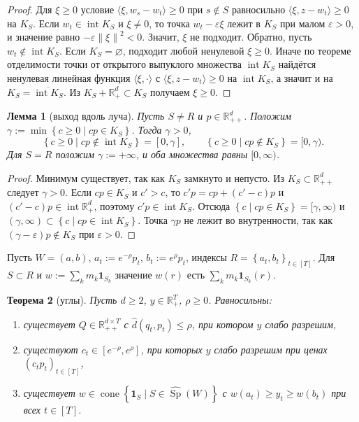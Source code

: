 \documentclass[a4paper,11pt]{article}
\theoremstyle{plain}
\newtheorem{theorem}{Теорема}[section]
\newtheorem{lemma}[theorem]{Лемма}
\theoremstyle{definition}
\theoremstyle{remark}
\newcommand{\R}{\mathbb{R}}
\newcommand{\norm}[1]{\left\lVert #1 \right\rVert}
\newcommand{\set}[1]{\left\{ #1 \right\}}
\newcommand{\ip}[2]{\langle #1, #2\rangle} %
\newcommand{\Rpp}[1][2]{\R^{#1}_{++}} %
\newcommand{\Rp}[1][2]{\R^{#1}_{+}}   %
\DeclareMathOperator{\cone}{cone}
\DeclareMathOperator{\Sp}{Sp}
\DeclareMathOperator{\interior}{int}
\newcommand{\dd}{\widehat d}
\begin{document}
\begin{proof}
    Для $\xi\ge0$ условие $\ip{\xi}{w_s-w_t}\ge0$ при $s\notin S$ равносильно $\ip{\xi}{z-w_t}\ge0$ на $K_S$. Если $w_t\in\interior K_S$ и $\xi\ne0$, то точка $w_t-\varepsilon\xi$ лежит в $K_S$ при малом $\varepsilon>0$, и значение равно $-\varepsilon\norm{\xi}^2<0$. Значит, $\xi$ не подходит. Обратно, пусть $w_t\notin\interior K_S$. Если $K_S=\varnothing$, подходит любой ненулевой $\xi\ge0$. Иначе по теореме отделимости точки от открытого выпуклого множества $\interior K_S$ найдётся ненулевая линейная функция $\ip{\xi}{\cdot}$ с $\ip{\xi}{z-w_t}\ge0$ на $\interior K_S$, а значит и на $K_S=\overline{\interior K_S}$. Из $K_S+\Rp[d]\subset K_S$ получаем $\xi\ge0$.
\end{proof}

\begin{lemma}[выход вдоль луча]\label{lem:ray}
    Пусть $S\ne R$ и $p\in\Rpp[d]$. Положим $\gamma:=\min\set{c\ge0\mid cp\in K_S}$. Тогда $\gamma>0$,
    \[
        \set{c\ge0\mid cp\notin\interior K_S}=[0,\gamma],\qquad\set{c\ge0\mid cp\notin K_S}=[0,\gamma).
    \]
    Для $S=R$ положим $\gamma:=+\infty$, и оба множества равны $[0,\infty)$.
\end{lemma}

\begin{proof}
    Минимум существует, так как $K_S$ замкнуто и непусто. Из $K_S\subset\Rpp[d]$ следует $\gamma>0$. Если $cp\in K_S$ и $c'>c$, то $c'p=cp+(c'-c)p$ и $(c'-c)p\in\interior\Rp[d]$, поэтому $c'p\in\interior K_S$. Отсюда $\set{c\mid cp\in K_S}=[\gamma,\infty)$ и $(\gamma,\infty)\subset\set{c\mid cp\in\interior K_S}$. Точка $\gamma p$ не лежит во внутренности, так как $(\gamma-\varepsilon)p\notin K_S$ при $\varepsilon>0$.
\end{proof}

Пусть $W=(a,b)$, $a_t:=e^{-\rho}p_t$, $b_t:=e^{\rho}p_t$, индексы $R=\set{a_t,b_t}_{t\in[T]}$. Для $S\subset R$ и $w:=\sum_km_k\mathbf 1_{S_k}$ значение $w(r)$ есть $\sum_km_k\mathbf 1_{S_k}(r)$.

\begin{theorem}[углы]\label{thm:corners}
    Пусть $d\ge2$, $y\in\Rp[T]$, $\rho\ge0$. Равносильны:
    \begin{enumerate}[label=(\Alph*)]
        \item существует $Q\in\Rpp[d\times T]$ с $\dd(q_t,p_t)\le\rho$, при котором $y$ слабо разрешим,
        \item существуют $c_t\in[e^{-\rho},e^{\rho}]$, при которых $y$ слабо разрешим при ценах $(c_tp_t)_{t\in[T]}$,
        \item существует $w\in\cone\set{\mathbf 1_S\mid S\in\widehat{\Sp}(W)}$ с $w(a_t)\ge y_t\ge w(b_t)$ при всех $t\in[T]$.
    \end{enumerate}
\end{theorem}
\end{document}
